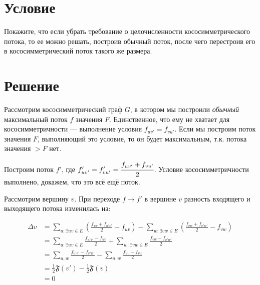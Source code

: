 

\cfoot{}



\section*{Условие}

Покажите, что если убрать требование о целочисленности кососимметрического потока, то ее
можно решать, построив обычный поток, после чего перестроив его в кососимметрический
поток такого же размера.

\section*{Решение}

Рассмотрим кососимметрический граф \(G\), в котором мы построили \textit{обычный} максимальный поток \(f\) значения \(F\). Единственное, что ему не хватает для кососимметричности --- выполнение условия \(f_{uv'} = f_{vu'}\). Если мы построим поток значения \(F\), выполняющий это условие, то он будет максимальным, т.к. потока значения \( > F\) нет.

Построим поток \(f'\), где \(f'_{uv'} = f'_{vu'} = \cfrac{f_{uv'} + f_{vu'}}{2}\). Условие кососимметричности выполнено, докажем, что это всё ещё поток.

Рассмотрим вершину \(v\). При переходе \(f \to f'\) в вершине \(v\) разность входящего и выходящего потока изменилась на:

\begin{align*}
    \Delta v & = \sum_{u : \exists uv\in E} \left(\frac{f_{uv} + f_{u'v'}}{2} - f_{uv}\right) - \sum_{w : \exists vw\in E} \left(\frac{f_{vw} + f_{v'w'}}{2} - f_{vw}\right) \\
             & = \sum_{u : \exists uv\in E} \frac{f_{u'v'} - f_{uv}}{2} + \sum_{w : \exists vw\in E} \frac{f_{vw} - f_{v'w'}}{2}                                             \\
             & = \sum_{u, w} \frac{f_{u'v'} - f_{v'w'}}{2} - \sum_{u, w} \frac{f_{uv} - f_{vw}}{2}                                                                           \\
             & = \frac{1}{2} \mathfrak{F}(v') - \frac{1}{2} \mathfrak{F}(v)                                                                                                  \\
             & = 0
\end{align*}

